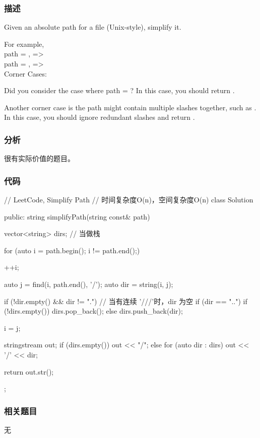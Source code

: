 \subsubsection{描述}
Given an absolute path for a file (Unix-style), simplify it.

For example, \\
path = , =>  \\
path = , =>  \\

Corner Cases:
\begindot
\item Did you consider the case where path = ? 
In this case, you should return .
\item 
Another corner case is the path might contain multiple slashes  together, such as .
In this case, you should ignore redundant slashes and return .
\myenddot


\subsubsection{分析}
很有实际价值的题目。


\subsubsection{代码}
\begin{Code}
	// LeetCode, Simplify Path
	// 时间复杂度O(n)，空间复杂度O(n)
	class Solution {
		public:
		string simplifyPath(string const& path) {
			vector<string> dirs; // 当做栈
			
			for (auto i = path.begin(); i != path.end();) {
				++i;
				
				auto j = find(i, path.end(), '/');
				auto dir = string(i, j);
				
				if (!dir.empty() && dir != ".") {// 当有连续 '///'时，dir 为空
					if (dir == "..") {
						if (!dirs.empty())
						dirs.pop_back();
					} else
					dirs.push_back(dir);
				}
				
				i = j;
			}
			
			stringstream out;
			if (dirs.empty()) {
				out << "/";
			} else {
			for (auto dir : dirs)
			out << '/' << dir;
		}
		
		return out.str();
	}
};
\end{Code}


\subsubsection{相关题目}
\begindot
\item 无
\myenddot


